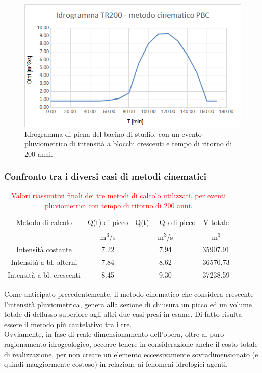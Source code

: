 \begin{figure}[H]  \centering
    \includegraphics[scale=0.8]{immagini/metodo_cinematico_p_b_crescenti.png}
    \caption{Idrogramma di piena del bacino di studio, con un evento pluviometrico di intensità a blocchi crescenti e tempo di ritorno di 200 anni.}
    \label{metodo_cinematico_p_b_crescenti}
\end{figure}    

\subsubsection{Confronto tra i diversi casi di metodi cinematici}

\begin{table}[H] \centering
    \caption{\textcolor{red}{Valori riassuntivi finali dei tre metodi di calcolo utilizzati, per eventi pluviometrici con tempo di ritorno di 200 anni.}}
        \begin{tabular}{cccc}
        \toprule
        Metodo di calcolo & Q(t) di picco  & Q(t) + Qb  di picco & V totale    \\
         & \unit{m^3/s}& \unit{m^3/s} & \unit{m^3} \\
         \midrule
Intensità costante & 7.22 & 7.94 & 35907.91 \\
Intensità a bl. alterni & 7.84 & 8.62 & 36570.73\\
Intensità a bl. crescenti & 8.45 & 9.30 & 37238.59 \\
        \bottomrule
        \end{tabular}
        \end{table}
Come anticipato precedentemente, il metodo cinematico che considera crescente l'intensità pluviometrica, genera alla sezione di chiusura un picco ed un volume totale di deflusso superiore agli altri due casi presi in esame. Di fatto risulta essere il metodo più cautelativo tra i tre.\\
Ovviamente, in fase di reale dimensionamento dell'opera, oltre al puro ragionamento idrogeologico, occorre tenere in considerazione anche il costo totale di realizzazione, per non creare un elemento eccessivamente sovradimensionato (e quindi maggiormente costoso) in relazione ai fenomeni idrologici agenti.